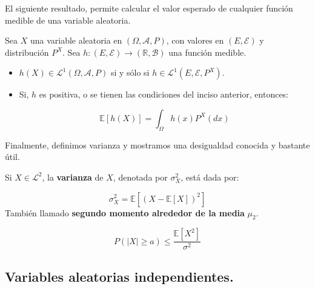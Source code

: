 El siguiente resultado, permite calcular el valor esperado de cualquier función medible de una variable aleatoria.
	
\begin{theorem}
	Sea $X$ una variable aleatoria en $(\Omega, \mathcal{A}, P)$, con valores en $(E, \mathcal{E})$ y distribución $P^X$. Sea $h: (E, \mathcal{E}) \rightarrow (\mathbb{R}, \mathcal{B})$ una función medible.

	\begin{itemize}
		\item $h(X) \in \mathcal{L}^1 (\Omega, \mathcal{A}, P)$ si y sólo si $h \in \mathcal{L}^1 (E, \mathcal{E}, P^X )$.
		\item Si, $h$ es positiva, o se tienen las condiciones del inciso anterior, entonces:

		\[
			\mathbb{E}[h(X)] = \int_{\Omega} h(x) P^X(dx)
		\] 
	\end{itemize}

\end{theorem}

Finalmente, definimos varianza y mostramos una desigualdad conocida y bastante útil.

\begin{boxDef}
	Si $X \in \mathcal{L}^2$, la \textbf{varianza} de $X$, denotada por $\sigma_X^2$, está dada por:

	\[
		\sigma_X^2 = \mathbb{E}[ (X - \mathbb{E}[X])^2 ]
	\] 
	También llamado \textbf{segundo momento alrededor de la media} $\mu_2$.
\end{boxDef}


\begin{theorem}
	\[ P( \lvert X\rvert \geq a ) \leq \frac{ \mathbb{E}[X^2] }{ \sigma^2 } \]
\end{theorem}









\subsection{Variables aleatorias independientes.}	

